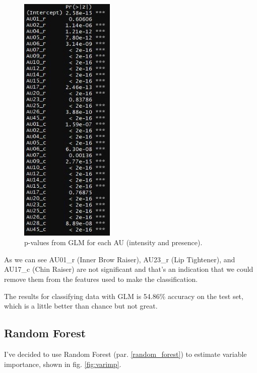 \begin{figure}[H]
	\centering
	\includegraphics[width=0.4\textwidth]{images/pval}
	\caption{p-values from GLM for each AU (intensity and presence).}
	\label{fig:pval}
\end{figure}

As we can see AU01\_r (Inner Brow Raiser), AU23\_r (Lip Tightener), and AU17\_c (Chin Raiser) are not significant and that's an indication that we could remove them from the features used to make the classification.

The results for classifying data with GLM is 54.86\% accuracy on the test set, which is a little better than chance but not great. 

\clearpage

\subsection{Random Forest} \label{rf}
I've decided to use Random Forest (par. \ref{random_forest}) to estimate variable importance, shown in fig. \ref{fig:varimp}.

